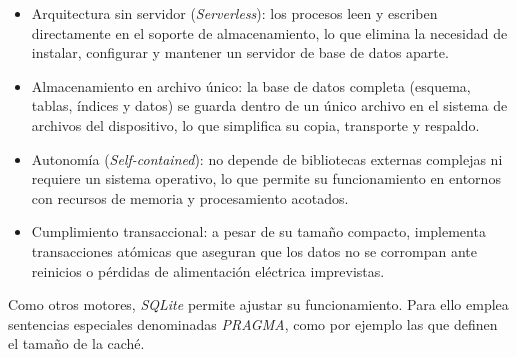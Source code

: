 \begin{itemize}
    \item Arquitectura sin servidor (\emph{Serverless}): los procesos leen y escriben directamente en el soporte de almacenamiento, lo que elimina la necesidad de instalar, configurar y mantener un servidor de base de datos aparte.
    \item Almacenamiento en archivo único: la base de datos completa (esquema, tablas, índices y datos) se guarda dentro de un único archivo en el sistema de archivos del dispositivo, lo que simplifica su copia, transporte y respaldo.
    \item Autonomía (\emph{Self-contained}): no depende de bibliotecas externas complejas ni requiere un sistema operativo, lo que permite su funcionamiento en entornos con recursos de memoria y procesamiento acotados.
    \item Cumplimiento transaccional: a pesar de su tamaño compacto, implementa transacciones atómicas que aseguran que los datos no se corrompan ante reinicios o pérdidas de alimentación eléctrica imprevistas.
\end{itemize}

Como otros motores, \emph{SQLite} permite ajustar su funcionamiento. Para ello emplea sentencias especiales denominadas \emph{PRAGMA}, como por ejemplo las que definen el tamaño de la caché.




